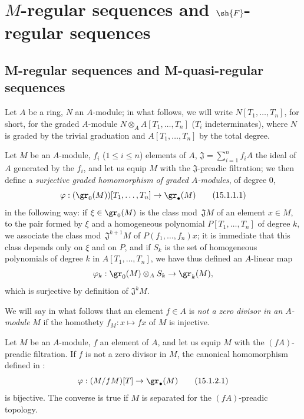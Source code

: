 \section{\texorpdfstring{$M$}{M}-regular sequences and \texorpdfstring{$\sh{F}$}{F}-regular sequences}
\label{section:0.15}

\subsection{M-regular sequences and M-quasi-regular sequences}
\label{subsection:0.15.1}
\label{0.15.1}

\begin{env}[15.1.1]
\label{0.15.1.1}
Let $A$ be a ring, $N$ an $A$-module;
in what follows, we will write $N[T_1,\ldots,T_n]$, for short, for the graded $A$-module $N\otimes_A A[T_1,\ldots,T_n]$ ($T_i$ indeterminates), where $N$ is graded by the trivial graduation and $A[T_1,\ldots,T_n]$ by the total degree.

Let $M$ be an $A$-module, $f_i$ ($1\leq i\leq n$) elements of $A$, $\mathfrak{J}=\sum_{i=1}^n f_iA$ the ideal of $A$ generated by the $f_i$, and let us equip $M$ with the $\mathfrak{J}$-preadic filtration;
we then define a \emph{surjective graded homomorphism of graded $A$-modules}, of degree $0$,
\[
\label{0.15.1.1.1}
  \varphi : (\gr_0(M))[T_1,\ldots,T_n] \to \gr_\bullet(M)
\tag{15.1.1.1}
\]
in the following way:
if $\xi\in\gr_0(M)$ is the class mod~$\mathfrak{J}M$ of an element $x\in M$, to the pair formed by $\xi$ and a homogeneous polynomial $P[T_1,\ldots,T_n]$ of degree $k$, we associate the class mod~$\mathfrak{J}^{k+1}M$ of $P(f_1,\ldots,f_n)x$;
it is immediate that this class depends only on $\xi$ and on $P$, and if $S_k$ is the set of homogeneous polynomials of degree $k$ in $A[T_1,\ldots,T_n]$, we have thus defined an $A$-linear map
\[
  \varphi_k : \gr_0(M)\otimes_A S_k \to \gr_k(M),
\]
which is surjective by definition of $\mathfrak{J}^k M$.

We will say in what follows that an element $f\in A$ is \emph{not a zero divisor in an $A$-module} $M$ if the homothety $f_M:x\mapsto fx$ of $M$ is injective.
\end{env}

\begin{lemma}[15.1.2]
\label{0.15.1.2}
Let $M$ be an $A$-module, $f$ an element of $A$, and let us equip $M$ with the $(fA)$-preadic filtration.
If $f$ is not a zero divisor in $M$, the canonical homomorphism defined in :
\[
\label{0.15.1.2.1}
  \varphi : (M/fM)[T] \to \gr_\bullet(M)
\tag{15.1.2.1}
\]
is bijective.
The converse is true if $M$ is separated for the $(fA)$-preadic topology.
\end{lemma}


